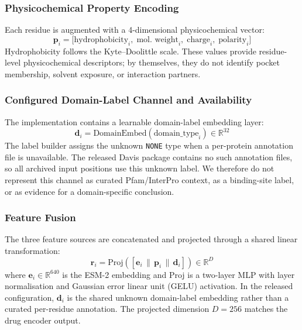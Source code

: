 \documentclass[fleqn,10pt]{wlscirep}
\begin{document}
\subsubsection{Physicochemical Property Encoding}

Each residue is augmented with a 4-dimensional physicochemical vector:
\begin{equation}
\mathbf{p}_i = \bigl[\text{hydrophobicity}_i,\;\text{mol.\ weight}_i,\;
  \text{charge}_i,\;\text{polarity}_i\bigr]
\end{equation}
Hydrophobicity follows the Kyte--Doolittle scale.\cite{kyte1982simple}
These values provide residue-level physicochemical descriptors; by themselves,
they do not identify pocket membership, solvent exposure, or interaction
partners.

\subsubsection{Configured Domain-Label Channel and Availability}

The implementation contains a learnable domain-label embedding layer:
\begin{equation}
\mathbf{d}_i = \mathrm{DomainEmbed}(\text{domain\_type}_i) \in \mathbb{R}^{32}
\end{equation}
The label builder assigns the unknown \texttt{NONE} type when a per-protein
annotation file is unavailable. The released Davis package contains no such
annotation files, so all archived input positions use this unknown label. We
therefore do not represent this channel as curated Pfam/InterPro context, as a
binding-site label, or as evidence for a domain-specific conclusion.

\subsubsection{Feature Fusion}

The three feature sources are concatenated and projected through a shared linear
transformation:
\begin{equation}
\mathbf{r}_i = \mathrm{Proj}\!\left(
  [\mathbf{e}_i \,\|\, \mathbf{p}_i \,\|\, \mathbf{d}_i]
\right) \in \mathbb{R}^{D}
\end{equation}
where $\mathbf{e}_i \in \mathbb{R}^{640}$ is the ESM-2 embedding and Proj is a
two-layer MLP with layer normalisation and Gaussian error linear unit (GELU)
activation. In the released configuration, $\mathbf{d}_i$ is the shared unknown
domain-label embedding rather than a curated per-residue annotation. The projected
dimension $D=256$ matches the drug encoder output.
\end{document}
